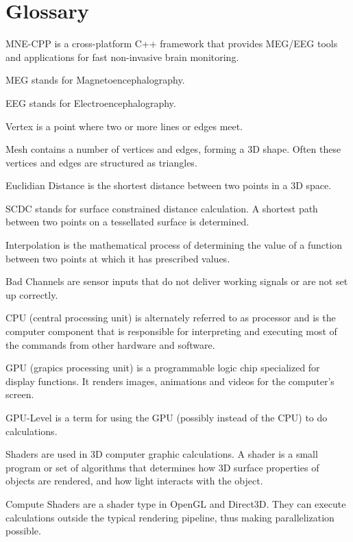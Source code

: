 \section{Glossary}

\begin{aims}
	
	\item[MNE-CPP] is a cross-platform C++ framework that provides MEG/EEG tools and applications for fast non-invasive brain 						monitoring.
	\item[MEG] stands for Magnetoencephalography. 
	\item[EEG] stands for Electroencephalography.
	\item[Vertex] is a point where two or more lines or edges meet.
	\item[Mesh]	contains a number of vertices and edges, forming a 3D shape. Often these vertices and edges are structured as 					triangles.
	\item[Euclidian Distance] is the shortest distance between two points in a 3D space.
	\item[SCDC]stands for surface constrained distance calculation. A shortest path between two points on a tessellated 					   surface is determined.
	\item[Interpolation] is the mathematical process of determining the value of a function between two points at which it has 						 prescribed values.
	\item[Bad Channels] are sensor inputs that do not deliver working signals or are not set up correctly.
	\item[CPU] (central processing unit) is alternately referred to as processor and is the computer component 				   			   that is responsible for interpreting and executing most of the commands from other hardware and software.
	\item[GPU] (grapics processing unit) is a programmable logic chip specialized for display functions. It renders images, 				   animations and videos for the computer's screen. 	
	\item[GPU-Level] is a term for using the GPU (possibly instead of the CPU) to do calculations.
	\item[Shaders] are used in 3D computer graphic calculations. A shader is a small program or set of algorithms that 							   determines how 3D surface properties of objects are rendered, and how light interacts with the object. 		
	\item[Compute Shaders] are a shader type in OpenGL and Direct3D. They can execute calculations outside the typical 									   rendering pipeline, thus making parallelization possible.

\end{aims}
